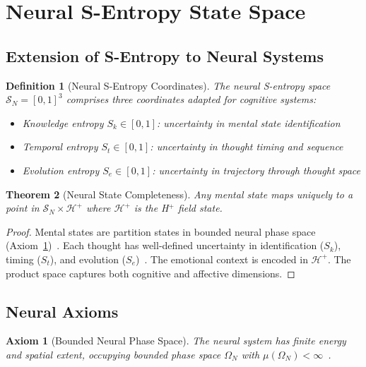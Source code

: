 \documentclass[aps,prd,twocolumn,superscriptaddress,floatfix,nofootinbib]{revtex4-2}
\newtheorem{theorem}{Theorem}[section]
\newtheorem{definition}[theorem]{Definition}
\newtheorem{axiom}{Axiom}
\theoremstyle{remark}
\newcommand{\Sk}{S_k}
\newcommand{\St}{S_t}
\newcommand{\Se}{S_e}
\newcommand{\Sspace}{\mathcal{S}}
\newcommand{\Hfield}{\mathcal{H}^+}
\begin{document}
\section{Neural S-Entropy State Space}
\label{sec:foundations}

\subsection{Extension of S-Entropy to Neural Systems}

\begin{definition}[Neural S-Entropy Coordinates]
\label{def:neural_s_entropy}
The neural S-entropy space $\Sspace_N = [0,1]^3$ comprises three coordinates adapted for cognitive systems:
\begin{itemize}
\item Knowledge entropy $\Sk \in [0,1]$: uncertainty in mental state identification
\item Temporal entropy $\St \in [0,1]$: uncertainty in thought timing and sequence
\item Evolution entropy $\Se \in [0,1]$: uncertainty in trajectory through thought space
\end{itemize}
\end{definition}

\begin{theorem}[Neural State Completeness]
\label{thm:neural_complete}
Any mental state maps uniquely to a point in $\Sspace_N \times \Hfield$ where $\Hfield$ is the H$^+$ field state.
\end{theorem}

\begin{proof}
Mental states are partition states in bounded neural phase space (Axiom~\ref{ax:bounded_neural})~\cite{callen1985thermodynamics}. Each thought has well-defined uncertainty in identification ($\Sk$), timing ($\St$), and evolution ($\Se$)~\cite{cover2006elements}. The emotional context is encoded in $\Hfield$. The product space captures both cognitive and affective dimensions.
\end{proof}

\subsection{Neural Axioms}

\begin{axiom}[Bounded Neural Phase Space]
\label{ax:bounded_neural}
The neural system has finite energy and spatial extent, occupying bounded phase space $\Omega_N$ with $\mu(\Omega_N) < \infty$~\cite{landau1980statistical,callen1985thermodynamics,jaynes1957information}.
\end{axiom}
\end{document}
